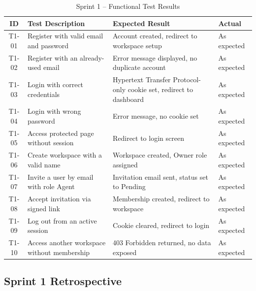 \documentclass[12pt,a4paper]{report}
\newcommand{\reporttablesetup}{%
  \small%
  \setlength{\tabcolsep}{5pt}%
  \renewcommand{\arraystretch}{1.38}%
  \arrayrulecolor{framegray}%
}
\begin{document}
\begin{table}[H]
  \centering
  \renewcommand{\arraystretch}{1.3}
  \footnotesize\reporttablesetup
  \begin{tabularx}{\textwidth}{|c|Y|p{3.85cm}|p{1.8cm}|}
    \hline
    \textbf{ID} & \textbf{Test Description} & \textbf{Expected Result} & \textbf{Actual} \\
    \hline
    T1-01 & Register with valid email and password         & Account created, redirect to workspace setup & As expected \\
    \hline
    T1-02 & Register with an already-used email            & Error message displayed, no duplicate account & As expected \\
    \hline
    T1-03 & Login with correct credentials                 & Hypertext Transfer Protocol-only cookie set, redirect to dashboard   & As expected \\
    \hline
    T1-04 & Login with wrong password                      & Error message, no cookie set                  & As expected \\
    \hline
    T1-05 & Access protected page without session          & Redirect to login screen                      & As expected \\
    \hline
    T1-06 & Create workspace with a valid name             & Workspace created, Owner role assigned        & As expected \\
    \hline
    T1-07 & Invite a user by email with role Agent         & Invitation email sent, status set to Pending  & As expected \\
    \hline
    T1-08 & Accept invitation via signed link              & Membership created, redirect to workspace     & As expected \\
    \hline
    T1-09 & Log out from an active session                 & Cookie cleared, redirect to login             & As expected \\
    \hline
    T1-10 & Access another workspace without membership    & 403 Forbidden returned, no data exposed       & As expected \\
    \hline
  \end{tabularx}
  \caption{Sprint 1 -- Functional Test Results}
  \label{tab:test-s1}
\end{table}

\subsection{Sprint 1 Retrospective}
\end{document}

